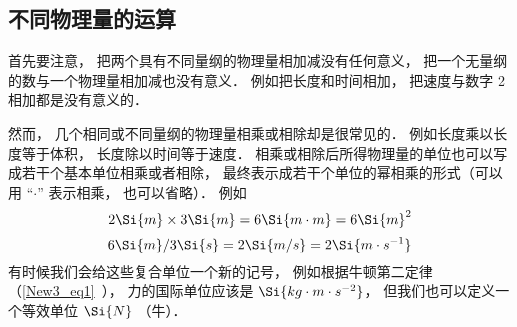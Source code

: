 \subsection{不同物理量的运算}
首先要注意， 把两个具有不同量纲的物理量相加减没有任何意义， 把一个无量纲的数与一个物理量相加减也没有意义． 例如把长度和时间相加， 把速度与数字 2 相加都是没有意义的．

然而， 几个相同或不同量纲的物理量相乘或相除却是很常见的． 例如长度乘以长度等于体积， 长度除以时间等于速度． 相乘或相除后所得物理量的单位也可以写成若干个基本单位相乘或者相除， 最终表示成若干个单位的幂相乘的形式（可以用 “$\cdot$” 表示相乘， 也可以省略）． 例如
\begin{equation}
2\Si{m} \times 3\Si{m} = 6\Si{m\cdot m} = 6\Si{m}^2
\end{equation}
\begin{equation}
6\Si{m} / 3\Si{s} = 2 \Si{m/s} = 2 \Si{m \cdot s^{-1}}
\end{equation}
有时候我们会给这些复合单位一个新的记号， 例如根据牛顿第二定律（\autoref{New3_eq1}~）， 力的国际单位应该是 $\Si{kg\cdot m\cdot s^{-2}}$， 但我们也可以定义一个等效单位 $\Si{N}$ （牛）．


